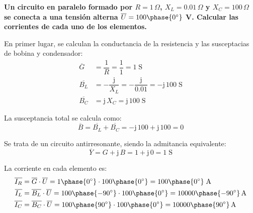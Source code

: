 	\vspace{4mm}
	\begin{example}\label{ej.2-5}
		\textbf{Un circuito en paralelo formado por $R=1\,\Omega$, ${X_L}=0.01\,\Omega$ y ${X_C}=100\,\Omega$ se conecta a una tensión alterna $\overline{U}=100\phase{0^\circ}$ V. Calcular las corrientes de cada uno de los elementos.}
		
		En primer lugar, se calculan la conductancia de la resistencia y las susceptacias de bobina y condensador: 
		\begin{align*}
			\overline{G}&=\dfrac{1}{R}=\dfrac{1}{1}=1\;\text{S}\\
			\overline{B_L}&=-\dfrac{\mathrm{j}}{X_L}=-\dfrac{\mathrm{j}}{0.01}=-\mathrm{j}\,100\;\text{S}\\
			\overline{B_C}&=\mathrm{j}\,X_C=\mathrm{j}\,100\;\text{S}
		\end{align*}
		
		La susceptancia total se calcula como:
		\begin{equation*}
			\overline{B}= \overline{B_L}+\overline{B_C}=-\mathrm{j}\,100+\mathrm{j}\,100=0
		\end{equation*}
		
		Se trata de un circuito antirresonante, siendo la admitancia equivalente:
		\begin{equation*}
			\overline{Y}=G+\mathrm{j}\,B=1+\mathrm{j}\,0=1\;\text{S}
		\end{equation*}
		
		La corriente en cada elemento es:
		\begin{align*}
			\overline{I_R}&=\overline{G}\cdot \overline{U}={1\phase{0^\circ}}\cdot {100\phase{0^\circ}}=100\phase{0^\circ}\;\text{A}\\
			\overline{I_L}&=\overline{B_L}\cdot\overline{U}=100\phase{-90^\circ}\cdot 100\phase{0^\circ}=10000\phase{-90^\circ}\,\text{A}\\
			\overline{I_C}&=\overline{B_C}\cdot\overline{U}=100\phase{90^\circ}\cdot 100\phase{0^\circ}=10000\phase{90^\circ}\,\text{A}
		\end{align*}
	\end{example}
	
	
	
	
